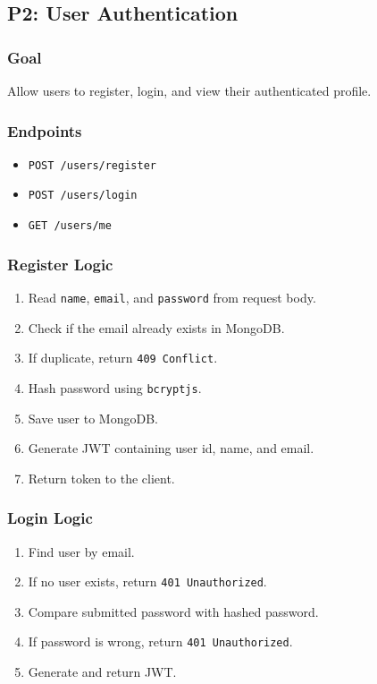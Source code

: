 \documentclass[11pt,a4paper]{article}
\begin{document}
\subsection{P2: User Authentication}

\subsubsection*{Goal}
Allow users to register, login, and view their authenticated profile.

\subsubsection*{Endpoints}

\begin{itemize}
  \item \texttt{POST /users/register}
  \item \texttt{POST /users/login}
  \item \texttt{GET /users/me}
\end{itemize}

\subsubsection*{Register Logic}

\begin{enumerate}
  \item Read \texttt{name}, \texttt{email}, and \texttt{password} from request body.
  \item Check if the email already exists in MongoDB.
  \item If duplicate, return \texttt{409 Conflict}.
  \item Hash password using \texttt{bcryptjs}.
  \item Save user to MongoDB.
  \item Generate JWT containing user id, name, and email.
  \item Return token to the client.
\end{enumerate}

\subsubsection*{Login Logic}

\begin{enumerate}
  \item Find user by email.
  \item If no user exists, return \texttt{401 Unauthorized}.
  \item Compare submitted password with hashed password.
  \item If password is wrong, return \texttt{401 Unauthorized}.
  \item Generate and return JWT.
\end{enumerate}
\end{document}
